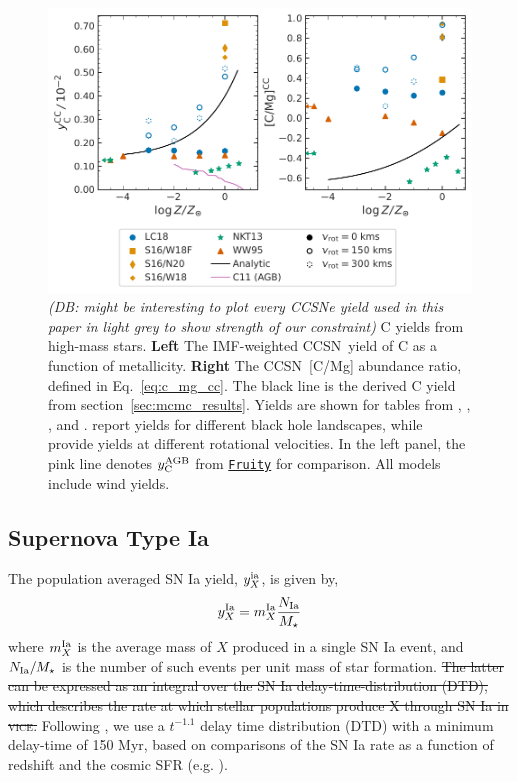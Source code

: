 \documentclass[fleqn,
usenatbib]{mnras}
\newcommand{\VICE}{\textsc{vice}}
\newcommand{\fruity}{\texttt{\hyperlink{fruity}{Fruity}}}
\newcommand{\cc}{CCSN}
\newcommand{\Ycagb}{{y_{\rm C}^{\rm AGB}}}
\newcommand{\dbstrike}[1]{{\color{Thistle} \sout{#1} }}
\newcommand{\dbnote}[1]{ {\color{Thistle} \textit{\small (DB: #1)}} }
\begin{document}
\begin{figure}
    \centering
    \includegraphics{cc_yields.pdf}
    \caption[]{
    \dbnote{might be interesting to plot every CCSNe yield used in this paper in light grey to show strength of our constraint}
        C yields from high-mass stars.
        \textbf{Left} The IMF-weighted \cc\ yield of C as a function of metallicity.
        \textbf{Right} The \cc\ [C/Mg] abundance ratio, defined in Eq.~\ref{eq:c_mg_cc}. The black line is the derived C yield from section~\ref{sec:mcmc_results}. Yields are shown for tables from 
    \citet[red triangles]{WW95}, \citet[orange square and diamond]{sukhbold+16}, 
    \citet[green stars]{NKT13}, and \citet[blue circles]{LC18}. \citet{sukhbold+16} report yields for different black hole landscapes, while \citet{LC18} provide yields at different rotational velocities.
    In the left panel, the pink line denotes $\Ycagb$ from \fruity{} for comparison. All models include wind yields. 
}
    \label{fig:y_cc}
\end{figure}


\subsection{Supernova Type Ia}
The population averaged SN Ia yield, $y_{X}^{\rm ia}$, is given by,
\begin{equation}
    y_{X}^{\rm Ia} = m_{X}^{\rm Ia} \frac{N_{\rm Ia}}{M_\star}
\end{equation}
where $m_{X}^{\rm Ia}$ is the average mass of $X$ produced in a single SN Ia event, and $N_{\rm Ia} / M_\star$ is the number of such events per unit mass of star formation. \dbstrike{The latter can be expressed as an integral over the SN Ia delay-time-distribution (DTD), which describes the rate at which stellar populations produce X through SN Ia in \VICE.} Following \citet{james+23}, we use a $t^{-1.1}$  delay time distribution (DTD) with a minimum delay-time of 150 Myr, based on comparisons of the SN Ia rate as a function of redshift and the cosmic SFR (e.g. \citealt{maoz+12}). 
\end{document}
